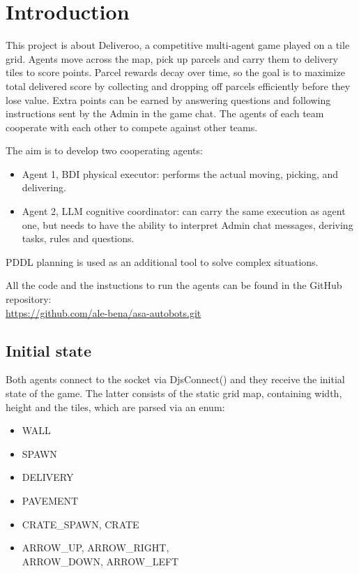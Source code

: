\chapter{Introduction}
\label{ch:introdution}
This project is about Deliveroo, a competitive multi-agent game played on a tile grid.
Agents move across the map, pick up parcels and carry them to delivery tiles to score points.
Parcel rewards decay over time, so the goal is to maximize total delivered score by collecting
and dropping off parcels efficiently before they lose value. 
Extra points can be earned by answering questions
and following instructions sent by the Admin in the game chat.
The agents of each team cooperate with each other to compete against other teams.

The aim is to develop two cooperating agents:
\begin{itemize}
\item {Agent 1, BDI physical executor}: performs the actual moving, picking, and delivering.
\item {Agent 2, LLM cognitive coordinator}: can carry the same execution as agent one, but needs to have the ability to interpret 
Admin chat messages, deriving tasks, rules and questions.
\end{itemize}
PDDL planning is used as an additional tool to solve complex situations.

All the code and the instuctions to run the agents can be found in the GitHub repository:\\ 
\url{https://github.com/ale-bena/asa-autobots.git}

\section{Initial state}
\label{sec:init_state}
Both agents connect to the socket via DjsConnect() and they receive the initial state of the game.
The latter consists of the static grid map, containing width, height and the tiles, which are parsed via an enum:

\noindent
{\small
\begin{minipage}[t]{0.5\textwidth}
\begin{itemize}
    \item WALL
    \item SPAWN
    \item DELIVERY
\end{itemize}
\end{minipage}%
\begin{minipage}[t]{0.5\textwidth}
\begin{itemize}
    \item PAVEMENT
    \item CRATE\_SPAWN, CRATE
    \item ARROW\_UP, ARROW\_RIGHT,\\ARROW\_DOWN, ARROW\_LEFT
\end{itemize}
\end{minipage}
}

